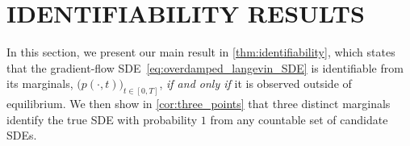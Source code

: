 \documentclass[twoside]{article}
\begin{document}








\section{IDENTIFIABILITY RESULTS}
\label{sec:iden_theory}




In this section, we present our main result in \cref{thm:identifiability}, which states that the gradient-flow SDE~\eqref{eq:overdamped_langevin_SDE} is identifiable from its marginals, $\bigl(p(\cdot, t)\bigr)_{t \in [0,T]}$, \emph{if and only if} it is observed outside of equilibrium.
We then show in \cref{cor:three_points} that three distinct marginals identify the true SDE with probability $1$ from any countable set of candidate SDEs.
\end{document}
